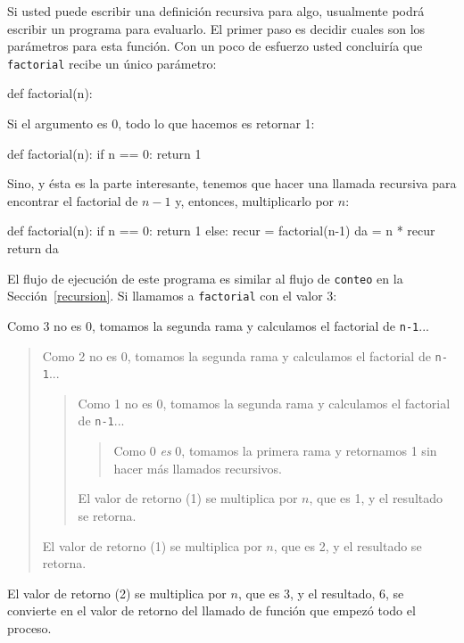  

Si usted puede escribir una definición recursiva para algo, usualmente
podrá escribir un programa para evaluarlo. El primer paso es decidir
cuales son los parámetros para esta función. Con un poco de esfuerzo
usted concluiría que \texttt{factorial} recibe un único parámetro:

\begin{pythoncode}
def factorial(n):
\end{pythoncode}

Si el argumento es 0, todo lo que hacemos es retornar 1:

\begin{pythoncode}
def factorial(n):
  if n == 0:
    return 1
\end{pythoncode}
 

Sino, y ésta es la parte interesante, tenemos que hacer una llamada
recursiva para encontrar el factorial de $n-1$ y, entonces, multiplicarlo
por $n$:
\begin{pythoncode}
def factorial(n):
  if n == 0:
    return 1
  else:
    recur = factorial(n-1)
    da = n * recur
    return da
\end{pythoncode}

El flujo de ejecución de este programa es similar al flujo de \texttt{conteo}
en la Sección~\ref{recursion}. Si llamamos a \texttt{factorial}
con el valor 3:


Como 3 no es 0, tomamos la segunda rama y calculamos el factorial
de \texttt{n-1}...
\begin{quote}
Como 2 no es 0, tomamos la segunda rama y calculamos el factorial
de \texttt{n-1}...

\begin{quote}
Como 1 no es 0, tomamos la segunda rama y calculamos el factorial
de \texttt{n-1}...

\begin{quote}
Como 0 {\em es} 0, tomamos la primera rama y retornamos 1 sin hacer
más llamados recursivos. 
\end{quote}
El valor de retorno (1) se multiplica por $n$, que es 1, y el resultado
se retorna. 
\end{quote}
El valor de retorno (1) se multiplica por $n$, que es 2, y el resultado
se retorna. 
\end{quote}
El valor de retorno (2) se multiplica por $n$, que es 3, y el resultado,
6, se convierte en el valor de retorno del llamado de función que
empezó todo el proceso.

